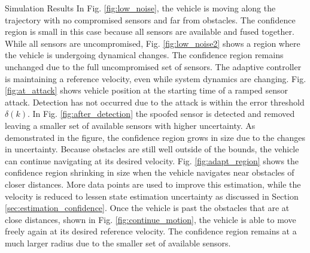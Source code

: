 \begin{section}{Simulation Results}
In Fig. \ref{fig:low_noise}, the vehicle is moving along the trajectory with no compromised sensors and far from obstacles. The confidence region is small in this case because all sensors are available and fused together. While all sensors are uncompromised, Fig. \ref{fig:low_noise2} shows a region where the vehicle is undergoing dynamical changes. The confidence region remains unchanged due to the full uncompromised set of sensors. The adaptive controller is maintaining a reference velocity, even while system dynamics are changing. Fig. \ref{fig:at_attack} shows vehicle position at the starting time of a ramped sensor attack. Detection has not occurred due to the attack is within the error threshold $\delta(k)$. In Fig. \ref{fig:after_detection} the spoofed sensor is detected and removed leaving a smaller set of available sensors with higher uncertainty. As demonstrated in the figure, the confidence region grows in size due to the changes in uncertainty. Because obstacles are still well outside of the bounds, the vehicle can continue navigating at its desired velocity. Fig. \ref{fig:adapt_region} shows the confidence region shrinking in size when the vehicle navigates near obstacles of closer distances. More data points are used to improve this estimation, while the velocity is reduced to lessen state estimation uncertainty as discussed in Section \ref{sec:estimation_confidence}. Once the vehicle is past the obstacles that are at close distances, shown in Fig. \ref{fig:continue_motion}, the vehicle is able to move freely again at its desired reference velocity. The confidence region remains at a much larger radius due to the smaller set of available sensors.


\begin{figure}[ht]
\vspace{-8pt}
\begin{tabular}{c}


\end{tabular}
\end{figure}
\end{section}
